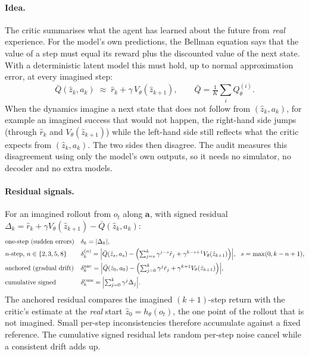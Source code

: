 \documentclass[11pt]{article}
\begin{document}
\paragraph{Idea.}
The critic summarises what the agent has learned about the future from \emph{real} experience. For the model's own
predictions, the Bellman equation says that the value of a step must equal its reward plus the discounted value of
the next state. With a deterministic latent model this must hold, up to normal approximation error, at every
imagined step:
\[
\bar Q(\hat z_k,a_k)\;\approx\;\hat r_k+\gamma\,V_\theta(\hat z_{k+1}),
\qquad \bar Q=\tfrac1K\textstyle\sum_i Q^{(i)}_\theta .
\]
When the dynamics imagine a next state that does not follow from $(\hat z_k,a_k)$, for example an imagined success
that would not happen, the right-hand side jumps (through $\hat r_k$ and $V_\theta(\hat z_{k+1})$) while the
left-hand side still reflects what the critic expects from $(\hat z_k,a_k)$. The two sides then disagree. The audit
measures this disagreement using only the model's own outputs, so it needs no simulator, no decoder and no extra
models.

\paragraph{Residual signals.}
For an imagined rollout from $o_t$ along $\mathbf a$, with signed residual
$\Delta_k=\hat r_k+\gamma V_\theta(\hat z_{k+1})-\bar Q(\hat z_k,a_k)$:
\begin{align*}
&\text{one-step (sudden errors)} && \delta_k=|\Delta_k|,\\
&\text{$n$-step, $n\in\{2,3,5,8\}$} && \delta^{(n)}_k=\Bigl|\bar Q(\hat z_s,a_s)-\Bigl(\textstyle\sum_{j=s}^{k}\gamma^{j-s}\hat r_j+\gamma^{k-s+1}V_\theta(\hat z_{k+1})\Bigr)\Bigr|,\ \ s=\max(0,k-n+1),\\
&\text{anchored (gradual drift)} && \delta^{\text{anc}}_k=\Bigl|\bar Q(\hat z_0,a_0)-\Bigl(\textstyle\sum_{j=0}^{k}\gamma^{j}\hat r_j+\gamma^{k+1}V_\theta(\hat z_{k+1})\Bigr)\Bigr|,\\
&\text{cumulative signed} && \delta^{\text{cum}}_k=\Bigl|\textstyle\sum_{j=0}^{k}\gamma^j\Delta_j\Bigr|.
\end{align*}
The anchored residual compares the imagined $(k+1)$-step return with the critic's estimate at the \emph{real} start
$\hat z_0=h_\theta(o_t)$, the one point of the rollout that is not imagined. Small per-step inconsistencies therefore
accumulate against a fixed reference. The cumulative signed residual lets random per-step noise cancel while a
consistent drift adds up.
\end{document}
